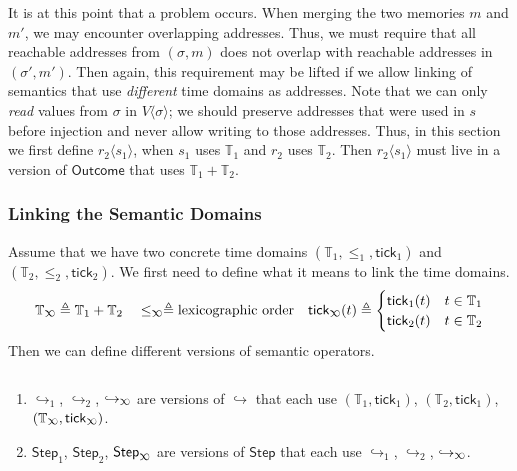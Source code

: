 \documentclass[acmsmall,screen,review]{acmart}\settopmatter{printfolios=true,printccs=false,printacmref=false}
\newcommand*{\Time}{\mathbb{T}}
\newcommand*{\ctx}{\sigma}
\newcommand*{\mem}{m}
\newcommand*{\Outcome}{\mathsf{Outcome}}
\newcommand*{\Step}{\mathsf{Step}}
\newcommand*{\semarrow}{\hookrightarrow}
\newcommand*{\semlink}{\mathbin{\rotatebox[origin=c]{180}{$\propto$}}}
\newcommand*{\tick}{\mathsf{tick}}
\newcommand*{\inject}[2]{{#2}\langle{#1}\rangle}
\begin{document}
It is at this point that a problem occurs.
When merging the two memories $\mem$ and $\mem'$, we may encounter overlapping addresses.
Thus, we must require that all reachable addresses from $(\ctx,\mem)$ does not overlap with reachable addresses in $(\ctx',\mem')$.
Then again, this requirement may be lifted if we allow linking of semantics that use \emph{different} time domains as addresses.
Note that we can only \emph{read} values from $\ctx$ in $\inject{\ctx}{V}$; we should preserve addresses that were used in $s$ before injection and never allow writing to those addresses.
Thus, in this section we first define $\inject{s_1}{r_2}$, when $s_1$ uses $\Time_1$ and $r_2$ uses $\Time_2$.
Then $\inject{s_1}{r_2}$ must live in a version of $\Outcome$ that uses $\Time_1+\Time_2$.

\subsubsection{Linking the Semantic Domains}
Assume that we have two concrete time domains $(\Time_1,\le_1,\tick_1)$ and $(\Time_2,\le_2,\tick_2)$.
We first need to define what it means to link the time domains.
\[
  \Time_{\semlink}\triangleq\Time_1+\Time_2\quad
  \le_{\semlink}\triangleq\text{lexicographic order}\quad
  \tick_{\semlink}(t)\triangleq
  \begin{cases}
    \tick_1(t) & t\in\Time_1 \\
    \tick_2(t) & t\in\Time_2
  \end{cases}
\]
Then we can define different versions of semantic operators.
\begin{definition}[Versions of $\semarrow$, $\Step$]$\:$

  \begin{enumerate}
    \item $\semarrow_1$, $\semarrow_2$, $\semarrow_{\semlink}$ are versions of $\semarrow$ that each use $(\Time_1,\tick_1)$, $(\Time_2,\tick_1)$, $(\Time_{\semlink},\tick_{\semlink})$.
    \item $\Step_1$, $\Step_2$, $\Step_{\semlink}$ are versions of $\Step$ that each use $\semarrow_1$, $\semarrow_2$, $\semarrow_{\semlink}$.
  \end{enumerate}
\end{definition}
\end{document}
